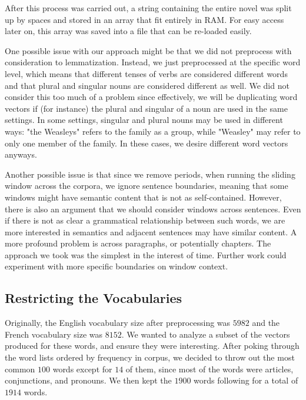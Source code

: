 \documentclass[12pt, usenames]{article}
\theoremstyle{definition}
\theoremstyle{definition}
\theoremstyle{definition}
\begin{document}
After this process was carried out, a string containing the entire novel was split up by spaces and stored in an array that fit entirely in RAM. For easy access later on, this array was saved into a file that can be re-loaded easily.

One possible issue with our approach might be that we did not preprocess with consideration to lemmatization. Instead, we just preprocessed at the specific word level, which means that different tenses of verbs are considered different words and that plural and singular nouns are considered different as well. We did not consider this too much of a problem since effectively, we will be duplicating word vectors if (for instance) the plural and singular of a noun are used in the same settings. In some settings, singular and plural nouns may be used in different ways: "the Weasleys" refers to the family as a group, while "Weasley" may refer to only one member of the family. In these cases, we desire different word vectors anyways.

Another possible issue is that since we remove periods, when running the sliding window across the corpora, we ignore sentence boundaries, meaning that some windows might have semantic content that is not as self-contained. However, there is also an argument that we should consider windows across sentences. Even if there is not as clear a grammatical relationship between such words, we are more interested in semantics and adjacent sentences may have similar content. A more profound problem is across paragraphs, or potentially chapters. The approach we took was the simplest in the interest of time. Further work could experiment with more specific boundaries on window context.

\subsection{Restricting the Vocabularies}

Originally, the English vocabulary size after preprocessing was $5982$ and the French vocabulary size was $8152$. We wanted to analyze a subset of the vectors produced for these words, and ensure they were interesting. After poking through the word lists ordered by frequency in corpus, we decided to throw out the most common $100$ words except for $14$ of them, since most of the words were articles, conjunctions, and pronouns. We then kept the $1900$ words following for a total of $1914$ words. 
\end{document}
